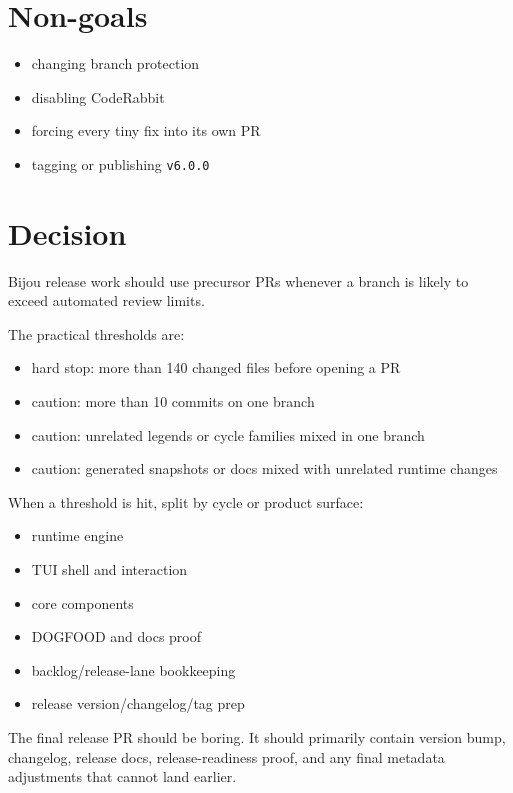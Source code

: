 \section{Non-goals}\label{record-205-non-goals}

\begin{itemize}
\tightlist
\item
  changing branch protection
\item
  disabling CodeRabbit
\item
  forcing every tiny fix into its own PR
\item
  tagging or publishing \texttt{v\allowbreak{}6\allowbreak{}.\allowbreak{}0\allowbreak{}.\allowbreak{}0}
\end{itemize}

\section{Decision}\label{record-205-decision}

Bijou release work should use precursor PRs whenever a branch is likely to exceed automated review limits.

The practical thresholds are:

\begin{itemize}
\tightlist
\item
  hard stop: more than 140 changed files before opening a PR
\item
  caution: more than 10 commits on one branch
\item
  caution: unrelated legends or cycle families mixed in one branch
\item
  caution: generated snapshots or docs mixed with unrelated runtime changes
\end{itemize}

When a threshold is hit, split by cycle or product surface:

\begin{itemize}
\tightlist
\item
  runtime engine
\item
  TUI shell and interaction
\item
  core components
\item
  DOGFOOD and docs proof
\item
  backlog/release-lane bookkeeping
\item
  release version/changelog/tag prep
\end{itemize}

The final release PR should be boring. It should primarily contain version bump, changelog, release docs, release-readiness proof, and any final metadata adjustments that cannot land earlier.

